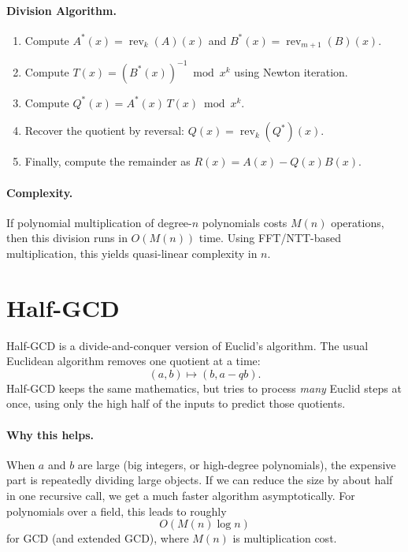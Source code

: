 \paragraph{Division Algorithm.}
\begin{enumerate}
  \item Compute $A^*(x) = \operatorname{rev}_k(A)(x)$ and $B^*(x) = \operatorname{rev}_{m+1}(B)(x)$.
  \item Compute $T(x) = (B^*(x))^{-1} \bmod x^k$ using Newton iteration.
  \item Compute $Q^*(x) = A^*(x)\,T(x) \bmod x^k$.
  \item Recover the quotient by reversal: $Q(x) = \operatorname{rev}_k(Q^*)(x)$.
  \item Finally, compute the remainder as $R(x) = A(x) - Q(x)B(x)$.
\end{enumerate}

\paragraph{Complexity.}
If polynomial multiplication of degree-$n$ polynomials costs $M(n)$ operations,
then this division runs in $O(M(n))$ time. Using FFT/NTT-based multiplication,
this yields quasi-linear complexity in $n$.
\section{Half-GCD}\label{algorithm:half-GCD}
Half-GCD is a divide-and-conquer version of Euclid's algorithm.
The usual Euclidean algorithm removes one quotient at a time:
\[
(a,b) \mapsto (b, a - qb).
\]
Half-GCD keeps the same mathematics, but tries to process \emph{many} Euclid steps at once,
using only the high half of the inputs to predict those quotients.

\paragraph{Why this helps.}
When $a$ and $b$ are large (big integers, or high-degree polynomials),
the expensive part is repeatedly dividing large objects.
If we can reduce the size by about half in one recursive call,
we get a much faster algorithm asymptotically.
For polynomials over a field, this leads to roughly
\[
O(M(n)\log n)
\]
for GCD (and extended GCD), where $M(n)$ is multiplication cost.


